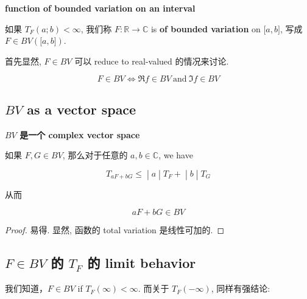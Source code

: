 \documentclass{qlnotes-export}
\begin{document}
\begin{definition}{\protect{}\label{kn-function-of-bounded-variation-on-an-interval}{\textbf{function
of bounded variation on an interval}}}

如果 \(T_{F}(a;b) < \infty\), 我们称 \(F:{\mathbb{R}}\rightarrow{\mathbb{C}}\) is \textbf{of bounded variation} on \(\lbrack a,b\rbrack\), 写成 \(F \in BV(\lbrack a,b\rbrack)\).

\end{definition}

首先显然, \(F \in BV\) 可以 reduce to real-valued 的情况来讨论.

\begin{proposition}

\[F \in BV\Leftrightarrow\Re f \in BV\ \text{and}\ \Im f \in BV\]

\end{proposition}

\subsection{\texorpdfstring{\(BV\) as a vector space}{BV as a vector space}}\label{bv-as-a-vector-space}

\begin{lemma}{\protect{}\label{kn-bv-complex-vector-space}{\textbf{\(BV\)
是一个 complex vector space}}}

如果 \(F,G \in BV\), 那么对于任意的 \(a,b \in {\mathbb{C}}\), we have

\[\left. T_{aF + bG} \leq \middle| a \middle| T_{F} + \middle| b \middle| T_{G} \right.\]

从而

\[aF + bG \in BV\]

\end{lemma}

\begin{proof}

易得. 显然, 函数的 total variation 是线性可加的.

\end{proof}

\subsection{\texorpdfstring{\(F \in BV\) 的 \(T_{F}\) 的 limit behavior}{F \textbackslash in BV 的 T\_\{F\} 的 limit behavior}}\label{f-in-bv-ux7684-t_f-ux7684-limit-behavior}

我们知道，\(F \in BV\) if \(T_{F}(\infty) < \infty\). 而关于 \(T_{F}( - \infty)\), 同样有强结论:
\end{document}
